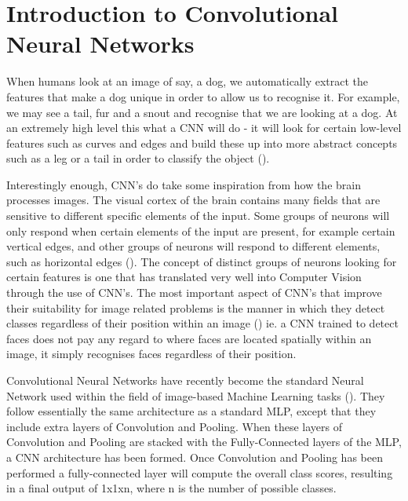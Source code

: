 \documentclass[12pt]{report}
\begin{document}
\newpage
\section{Introduction to Convolutional Neural Networks}

\begin{flushleft}
When humans look at an image of say, a dog, we automatically extract the features that make a dog unique in order to allow us to recognise it. For example, we may see a tail, fur and a snout and recognise that we are looking at a dog. At an extremely high level this what a CNN will do - it will look for certain low-level features such as curves and edges and build these up into more abstract concepts such as a leg or a tail in order to classify the object (\cite{lecun1995convolutional}).
\end{flushleft}

\begin{flushleft}
Interestingly enough, CNN's do take some inspiration from how the brain processes images. The visual cortex of the brain contains many fields that are sensitive to different specific elements of the input. Some groups of neurons will only respond when certain elements of the input are present, for example certain vertical edges, and other groups of neurons will respond to different elements, such as horizontal edges (\cite{youtube}). The concept of distinct groups of neurons looking for certain features is one that has translated very well into Computer Vision through the use of CNN's. The most important aspect of CNN's that improve their suitability for image related problems is the manner in which they detect classes regardless of their position within an image (\cite{albawi2017understanding}) ie. a CNN trained to detect faces does not pay any regard to where faces are located spatially within an image, it simply recognises faces regardless of their position.
\end{flushleft}

\begin{flushleft}
Convolutional Neural Networks have recently become the standard Neural Network used within the field of image-based Machine Learning tasks (\cite{o2015introduction}). They follow essentially the same architecture as a standard MLP, except that they include extra layers of Convolution and Pooling. When these layers of Convolution and Pooling are stacked with the Fully-Connected layers of the MLP, a CNN architecture has been formed. Once Convolution and Pooling has been performed a fully-connected layer will compute the overall class scores, resulting in a final output of 1x1xn, where n is the number of possible classes.
\end{flushleft}
\end{document}
